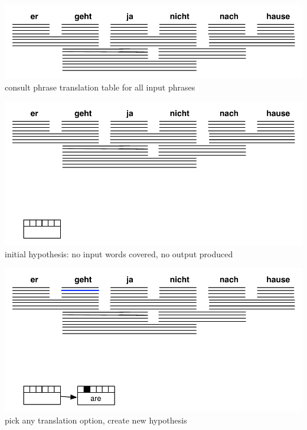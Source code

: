 \documentclass[landscape]{uedslides2C}
\begin{document}

\begin{center}
\includegraphics[scale=1.3]{decoding-step1.pdf}\\[69mm]
consult phrase translation table for all input phrases
\end{center}


\begin{center} 
\includegraphics[scale=1.3]{decoding-step2.pdf}\\[22mm]
initial hypothesis: no input words covered, no output produced
\end{center}


\begin{center}
\includegraphics[scale=1.3]{decoding-step3.pdf}\\[22mm]
pick any translation option, create new hypothesis
\end{center} 
\end{document}
